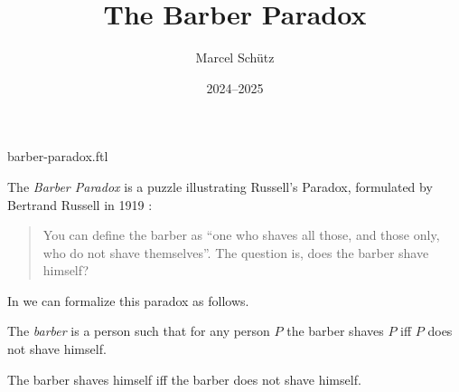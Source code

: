 \documentclass{article}
\title{The Barber Paradox}
\author{Marcel Schütz}
\date{2024--2025}
\begin{document}
\begin{smodule}{barber-paradox.ftl}
\maketitle


\noindent The \emph{Barber Paradox} is a puzzle illustrating Russell's
Paradox, formulated by Bertrand Russell in 1919 \cite[p. 355]{Russell1919}:

\begin{quotation}
  \ifstexhtml\else\noindent\fi
  You can define the barber as ``one who shaves all those, and 
  those only, who do not shave themselves''.
  The question is, does the barber shave himself?
\end{quotation}

\noindent In \Naproche we can formalize this paradox as follows.

\begin{forthel}
  \begin{signature*}
    The \emph{barber} is a person such that for any person $P$ the barber shaves $P$ iff $P$ does not shave himself.
  \end{signature*}
  
  \begin{theorem*}[title=Barber Paradox,id=barber_paradox]
    The barber shaves himself iff the barber does not shave himself.
  \end{theorem*}
\end{forthel}

\printbibliography
{}
\end{smodule}
\end{document}
